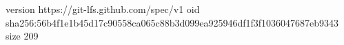 version https://git-lfs.github.com/spec/v1
oid sha256:56b4f1e1b45d17c90558ca065c88b3d099ea925946df1f3f1036047687eb9343
size 209
